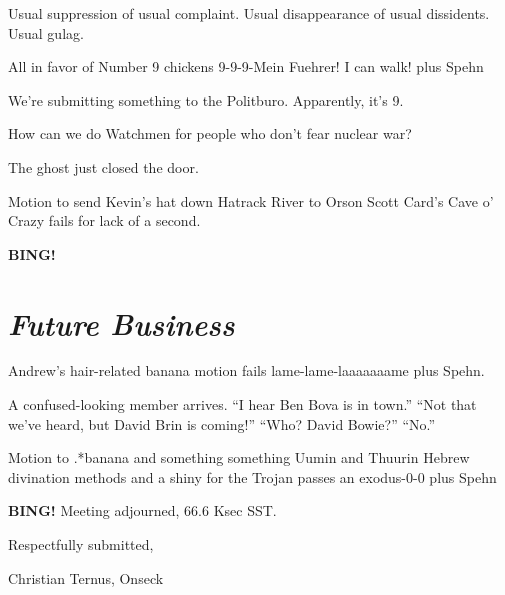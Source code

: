 \documentclass[10pt]{article}
\newcommand{\bing}{{\bf BING!} }
\newcommand{\goto}[1]{\bing \vskip 12pt \section*{{\em{#1}}}}
\newcommand{\ps}{ plus Spehn\xspace}
\begin{document}
Usual suppression of usual complaint.  Usual disappearance of usual
dissidents.  Usual gulag.

All in favor of Number 9 chickens 9-9-9-Mein Fuehrer!  I can walk!\ps

We're submitting something to the Politburo.  Apparently, it's 9.

How can we do Watchmen for people who don't fear nuclear war?

The ghost just closed the door.

Motion to send Kevin's hat down Hatrack River to Orson Scott Card's
Cave o' Crazy fails for lack of a second.

\goto{Future Business}

Andrew's hair-related banana motion fails lame-lame-laaaaaaame\ps.

A confused-looking member arrives. ``I hear Ben Bova is in town.''
``Not that we've heard, but David Brin is coming!''  ``Who?  David
Bowie?'' ``No.''

Motion to .*banana and something something Uumin and Thuurin Hebrew
divination methods and a shiny for the Trojan passes an exodus-0-0\ps

\bing
\noindent
Meeting adjourned, 66.6 Ksec SST.

\vspace{18pt}

\centerline{Respectfully submitted,}
\centerline{Christian Ternus, Onseck}
\end{document}
